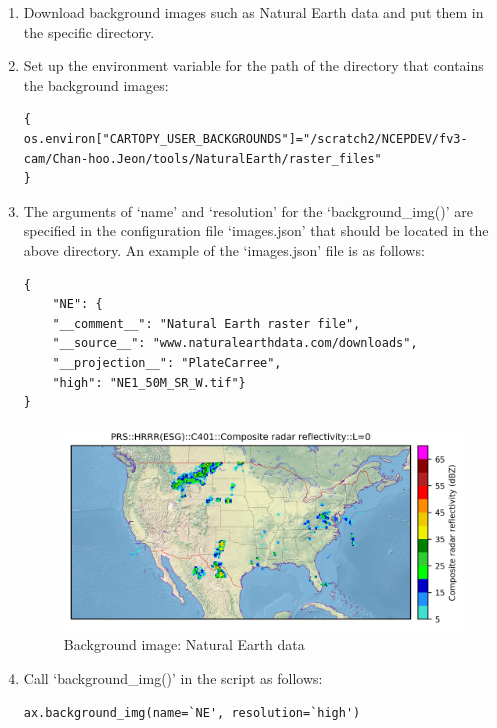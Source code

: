 \documentclass[11pt,fleqn]{report}              %
\begin{document}
\begin{enumerate}
\item Download background images such as Natural Earth data and put them in the specific directory.

\item Set up the environment variable for the path of the directory that contains the background images:
\lstset{language=bash}   
\begin{lstlisting}[frame=trBL,basicstyle=\scriptsize]
{
os.environ["CARTOPY_USER_BACKGROUNDS"]="/scratch2/NCEPDEV/fv3-cam/Chan-hoo.Jeon/tools/NaturalEarth/raster_files"
}
\end{lstlisting}


\item  The arguments of `name' and `resolution' for the `background\_img()' are specified in the configuration file `images.json' that should be located in the above directory. An example of the `images.json' file is as follows: 

\lstset{language=bash}   
\begin{lstlisting}[frame=trBL,basicstyle=\scriptsize]
{
    "NE": {
    "__comment__": "Natural Earth raster file",
    "__source__": "www.naturalearthdata.com/downloads",
    "__projection__": "PlateCarree",
    "high": "NE1_50M_SR_W.tif"}
}
\end{lstlisting}

\begin{figure}[ht!]
  \centering
  \includegraphics[width=0.7\linewidth]{fv3_out_prs_HRRR_esg_C401_refc_unknown_L001.png}
  \caption{Background image: Natural Earth data}
  \label{fig:py_background_img}
\end{figure}

\item Call `background\_img()' in the script as follows:
\lstset{language=bash}   
\begin{lstlisting}[frame=trBL]
ax.background_img(name=`NE', resolution=`high')
\end{lstlisting} 

\end{enumerate}
\end{document}
